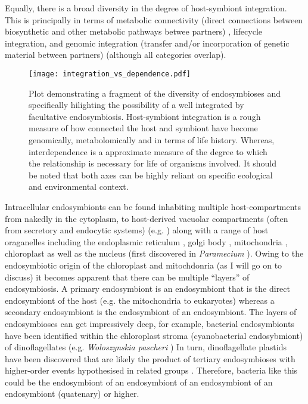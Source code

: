Equally, there is a broad diversity in the degree of host-symbiont integration. This is principally in terms of
metabolic connectivity (direct connections between biosynthetic and other metabolic pathways betwee partners) \citep{Karkar2015},
lifecycle integration, and genomic integration (transfer and/or incorporation of genetic material 
between partners) \citep{Timmis2004} (although all categories overlap).

\begin{figure}[h!]
\texttt{[image: integration\_vs\_dependence.pdf]}
    \caption{ 
        Plot demonstrating a fragment of the diversity of endosymbioses and specifically hilighting the possibility of
        a well integrated by facultative endosymbiosis.
        Host-symbiont integration is a rough measure of how connected the host and symbiont have become genomically, metabolomically
        and in terms of life history.  Whereas, interdependence is a approximate measure of the degree to 
        which the relationship is necessary for life of organisms involved. 
        It should be noted that both axes can be highly reliant on specific ecological and environmental context.
    }
    \label{fig:integrationvsdependence}
\end{figure}

Intracellular endosymbionts can be found inhabiting multiple host-compartments from nakedly in the cytoplasm, to host-derived
vacuolar compartments (often from secretory and endocytic systems) (e.g. \citep{Kodama2009}) along with a range of 
host oraganelles including the endoplasmic reticulum \citep{Vogt1992}, golgi body \citep{Cho2011},
mitochondria \cite{Sassera2006}, chloroplast \citep{Wilcox1986} as well as the nucleus 
(first discovered in \textit{Paramecium} \citep{Schulz2015}).
Owing to the endosymbiotic origin of the chloroplast and mitochdonria (as I will go on to discuss) it becomes apparent
that there can be multiple ``layers'' of endosymbiosis. A primary endosymbiont is an endosymbiont that is the direct
endosymbiont of the host (e.g. the mitochondria to eukaryotes) whereas a secondary endosymbiont is the endosymbiont of
an endosymbiont.
The layers of endosymbioses can get impressively deep, for example, bacterial endosymbionts have been identified within the 
chloroplast stroma (cyanobacterial endosybmiont) of dinoflagellates (e.g. \textit{Woloszynskia pascheri} \citep{Wilcox1986})
In turn, dinoflagellate plastids have been discovered that are likely the product of tertiary endosymbioses \citep{Gabrielsen2011} 
with higher-order events hypothesised in related groups \citep{Stiller2014}.
Therefore, bacteria like this could be the endosymbiont of an endosymbiont of an endosymbiont of an endosymbiont (quatenary) or
higher.


